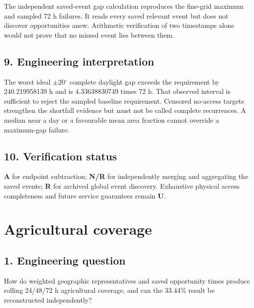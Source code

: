 \documentclass[10pt,a4paper]{article}
\numberwithin{equation}{section}
\begin{document}
\begin{sloppypar}The independent saved-event gap calculation reproduces the fine-grid maximum and sampled 72 h failures. It reads every saved relevant event but does not discover opportunities anew. Arithmetic verification of two timestamps alone would not prove that no missed event lies between them.\end{sloppypar}


\subsection*{9. Engineering interpretation}
\begin{sloppypar}The worst ideal \ensuremath{\pm}20\ensuremath{{}^{\circ}} complete daylight gap exceeds the requirement by 240.219958139 h and is 4.33638830749 times 72 h. That observed interval is sufficient to reject the sampled baseline requirement. Censored no-access targets strengthen the shortfall evidence but must not be called complete recurrences. A median near a day or a favourable mean area fraction cannot override a maximum-gap failure.\end{sloppypar}


\subsection*{10. Verification status}
\begin{sloppypar}\textbf{A} for endpoint subtraction; \textbf{N/R} for independently merging and aggregating the saved events; \textbf{R} for archived global event discovery. Exhaustive physical access completeness and future service guarantees remain \textbf{U}.\end{sloppypar}


\clearpage\section{Agricultural coverage}\label{ch:10}

\subsection*{1. Engineering question}
\begin{sloppypar}How do weighted geographic representatives and saved opportunity times produce rolling 24/48/72 h agricultural coverage, and can the 33.44\% result be reconstructed independently?\end{sloppypar}
\end{document}
